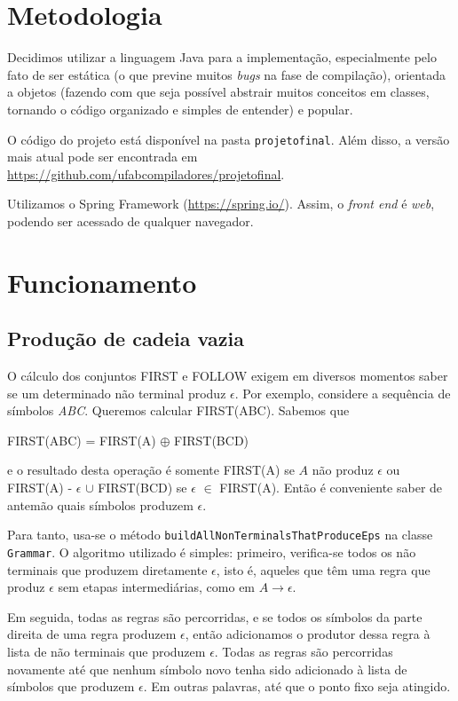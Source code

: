 \documentclass[11pt]{article}
\begin{document}
\section{Metodologia}
\label{sec:orgheadline5}
Decidimos utilizar a linguagem Java para a implementação, especialmente pelo
fato de ser estática (o que previne muitos \emph{bugs} na fase de compilação),
orientada a objetos (fazendo com que seja possível abstrair muitos conceitos em
classes, tornando o código organizado e simples de entender) e popular.

O código do projeto está disponível na pasta \texttt{projetofinal}. Além disso, a versão
mais atual pode ser encontrada em \url{https://github.com/ufabcompiladores/projetofinal}.

Utilizamos o Spring Framework (\url{https://spring.io/}). Assim, o \emph{front end} é
\emph{web}, podendo ser acessado de qualquer navegador.

\section{Funcionamento}
\label{sec:orgheadline14}
\subsection{Produção de cadeia vazia}
\label{sec:orgheadline6}
O cálculo dos conjuntos FIRST e FOLLOW exigem em diversos momentos saber se
um determinado não terminal produz \(\epsilon\). Por exemplo, considere a sequência
de símbolos \emph{ABC}. Queremos calcular FIRST(ABC). Sabemos que

\begin{center}
FIRST(ABC) = FIRST(A) \(\oplus\) FIRST(BCD)
\end{center}

e o resultado desta operação é somente FIRST(A) se \(A\) não produz \(\epsilon\) ou
FIRST(A) - \(\epsilon\) \(\cup\) FIRST(BCD) se \(\epsilon\) \(\in\) FIRST(A). Então é conveniente saber de
antemão quais símbolos produzem \(\epsilon\).

Para tanto, usa-se o método \texttt{buildAllNonTerminalsThatProduceEps} na classe
\texttt{Grammar}. O algoritmo utilizado é simples: primeiro, verifica-se todos os não
terminais que produzem diretamente \(\epsilon\), isto é, aqueles que têm uma regra
que produz \(\epsilon\) sem etapas intermediárias, como em \(A \rightarrow \epsilon\).

Em seguida, todas as regras são percorridas, e se todos os símbolos da parte
direita de uma regra produzem \(\epsilon\), então adicionamos o produtor dessa regra
à lista de não terminais que produzem \(\epsilon\). Todas as regras são percorridas
novamente até que nenhum símbolo novo tenha sido adicionado à lista de símbolos
que produzem \(\epsilon\). Em outras palavras, até que o ponto fixo seja atingido.
\end{document}
